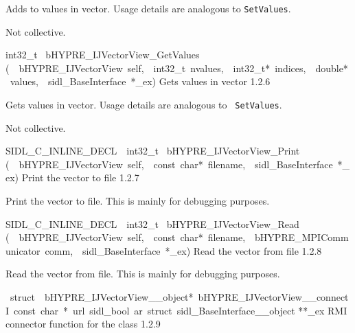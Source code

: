 \documentclass{article}
\begin{document}
\begin{cxxentry}
\begin{cxxentry}
\begin{cxxfunction}
\begin{cxxdoc}
Adds to values in vector.  Usage details are analogous to
{\tt SetValues}.

Not collective.
\end{cxxdoc}
\end{cxxfunction}
\begin{cxxfunction}
{int32\_t\ }
        {bHYPRE\_IJVectorView\_GetValues}
        {(\ \ bHYPRE\_IJVectorView\ self,\ \ int32\_t\ nvalues,\ \ int32\_t*\ indices,\ \ double*\ values,\ \ sidl\_BaseInterface\ *\_ex)}
        {
Gets values in vector}
        {1.2.6}
\begin{cxxdoc}

Gets values in vector.  Usage details are analogous to {\tt
SetValues}.

Not collective.
\end{cxxdoc}
\end{cxxfunction}
\begin{cxxfunction}
{SIDL\_C\_INLINE\_DECL\ \ int32\_t\ }
        {bHYPRE\_IJVectorView\_Print}
        {(\ \ bHYPRE\_IJVectorView\ self,\ \ const\ char*\ filename,\ \ sidl\_BaseInterface\ *\_ex)}
        {
Print the vector to file}
        {1.2.7}
\begin{cxxdoc}

Print the vector to file.  This is mainly for debugging
purposes.
\end{cxxdoc}
\end{cxxfunction}
\begin{cxxfunction}
{SIDL\_C\_INLINE\_DECL\ \ int32\_t\ }
        {bHYPRE\_IJVectorView\_Read}
        {(\ \ bHYPRE\_IJVectorView\ self,\ \ const\ char*\ filename,\ \ bHYPRE\_MPICommunicator\ comm,\ \ sidl\_BaseInterface\ *\_ex)}
        {
Read the vector from file}
        {1.2.8}
\begin{cxxdoc}

Read the vector from file.  This is mainly for debugging
purposes.
\end{cxxdoc}
\end{cxxfunction}
\begin{cxxvariable}
{\ struct\ \ bHYPRE\_IJVectorView\_\_object*\ bHYPRE\_IJVectorView\_\_connectI\ const\ char\ *\ url\ sidl\_bool\ ar\ struct\ sidl\_BaseInterface\_\_object}
        {**\_ex}
        {}
        {
RMI connector function for the class}
        {1.2.9}
\begin{cxxdoc}


\end{cxxdoc}
\end{cxxvariable}
\end{cxxentry}
\end{cxxentry}
\end{document}
